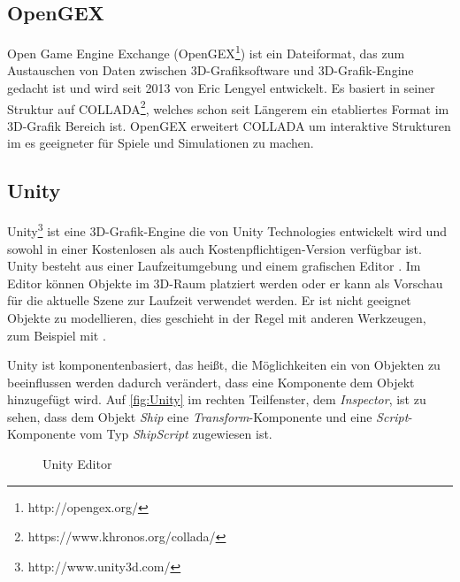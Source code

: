 \subsection{OpenGEX}
\label{sec:OpenGEX}

Open Game Engine Exchange (OpenGEX\footnote{http://opengex.org/}) ist ein Dateiformat, das zum Austauschen von Daten zwischen 3D-Grafiksoftware und 3D-Grafik-Engine gedacht ist und wird seit 2013 von Eric Lengyel entwickelt. Es basiert in seiner Struktur auf COLLADA\footnote{https://www.khronos.org/collada/}, welches schon seit Längerem ein etabliertes Format im 3D-Grafik Bereich ist. OpenGEX erweitert COLLADA um interaktive Strukturen im es geeigneter für Spiele und Simulationen zu machen. \cite{Lengyel.2014}

\subsection{Unity}
\label{sec:unity}

Unity\footnote{http://www.unity3d.com/} ist eine 3D-Grafik-Engine die von Unity Technologies entwickelt wird und sowohl in einer Kostenlosen als auch Kostenpflichtigen-Version verfügbar ist. Unity besteht aus einer Laufzeitumgebung und einem grafischen Editor \cite[S.29]{Gregory.2014}. Im Editor können Objekte im 3D-Raum platziert werden oder er kann als Vorschau für die aktuelle Szene zur Laufzeit verwendet werden. Er ist nicht geeignet Objekte zu modellieren, dies geschieht in der Regel mit anderen Werkzeugen, zum Beispiel mit .

Unity ist komponentenbasiert, das heißt, die Möglichkeiten ein von Objekten zu beeinflussen werden dadurch verändert, dass eine Komponente dem Objekt hinzugefügt wird. Auf \autoref{fig:Unity} im rechten Teilfenster, dem \emph{Inspector}, ist zu sehen, dass dem Objekt \emph{Ship} eine \emph{Transform}-Komponente und eine \emph{Script}-Komponente vom Typ \emph{ShipScript} zugewiesen ist.

\begin{figure}[htbp]
  \centering
  \caption{Unity Editor}
  \label{fig:Unity}
\end{figure}
